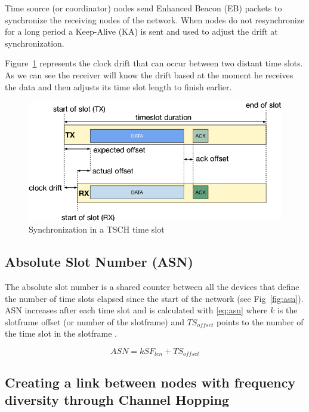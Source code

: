 Time source (or coordinator) nodes send Enhanced Beacon (EB) packets to synchronize the receiving
nodes of the network. When nodes do not resynchronize for a long period
a Keep-Alive (KA) is sent and used to adjust the drift at synchronization.

Figure~\ref{fig:sync} represents the clock drift that can occur between two
distant time slots.
As we can see the receiver will know the drift based at the moment he receives
the data and then adjusts its time slot length to finish earlier.

\begin{figure}[H]
  \centering
  \includegraphics[width=\textwidth]{thesis.tex/chapters/context/fig/sync.png}
  \caption{Synchronization in a TSCH time slot\cite{TELESHERMETO201784}\label{fig:sync}}
\end{figure}

\subsection{Absolute Slot Number (ASN)}

The absolute slot number is a shared counter between all the devices that
define the number of time slots elapsed since the start of the
network (see Fig~\ref{fig:asn}).
ASN increases after each time slot and is calculated with \ref{eq:asn} where $k$
is the slotframe offset (or number of the slotframe) and $TS_{offset}$ points
to the number of the time slot in the slotframe .

\begin{equation}
  \label{eq:asn}
  ASN = k SF_{len} + TS_{offset}
\end{equation}



\subsection{Creating a link between nodes with frequency diversity through Channel Hopping}

